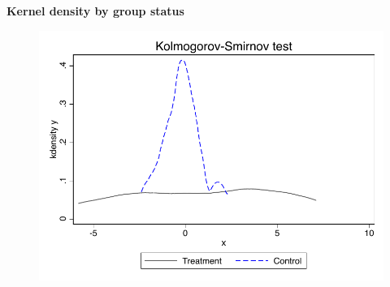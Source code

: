 \documentclass[notes=show]{beamer}
\begin{document}
\begin{frame}[plain]
\begin{center}
\textbf{Kernel density by group status}
\end{center}

	\begin{figure}
	\includegraphics[scale=0.8]{./lecture_includes/ks.pdf}     
	\end{figure}
	
\end{frame}


% 



% 

\end{document}
